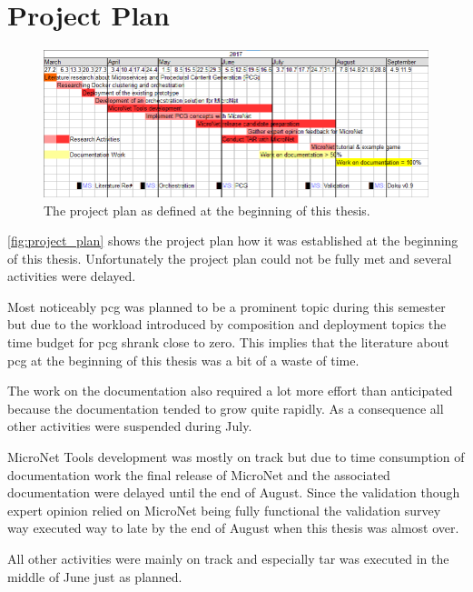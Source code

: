 \chapter{Project Plan}

\begin{figure}[H]
	\hspace*{-1.6cm}
  	\centering
  	\includegraphics[width=1.2\textwidth]{images/ProjectPlan}
  	\caption{The project plan as defined at the beginning of this thesis.}
  	\label{fig:project_plan}
\end{figure}


\autoref{fig:project_plan} shows the project plan how it was established at the
beginning of this thesis. Unfortunately the project plan could not be fully met
and several activities were delayed.

Most noticeably \gls{pcg} was planned to be a prominent topic during this semester but
due to the workload introduced by composition and deployment topics the time
budget for \gls{pcg} shrank close to zero. This implies that the literature
about \gls{pcg} at the beginning of this thesis was a bit of a waste of time.

The work on the documentation also required a lot more effort than anticipated
because the documentation tended to grow quite rapidly. As a consequence all
other activities were suspended during July.

MicroNet Tools development was mostly on track but due to time consumption of
documentation work the final release of MicroNet and the associated
documentation were delayed until the end of August. Since the validation though
expert opinion relied on MicroNet being fully functional the validation survey
way executed way to late by the end of August when this thesis was almost over. 

All other activities were mainly on track and especially \gls{tar} was executed
in the middle of June just as planned.  
